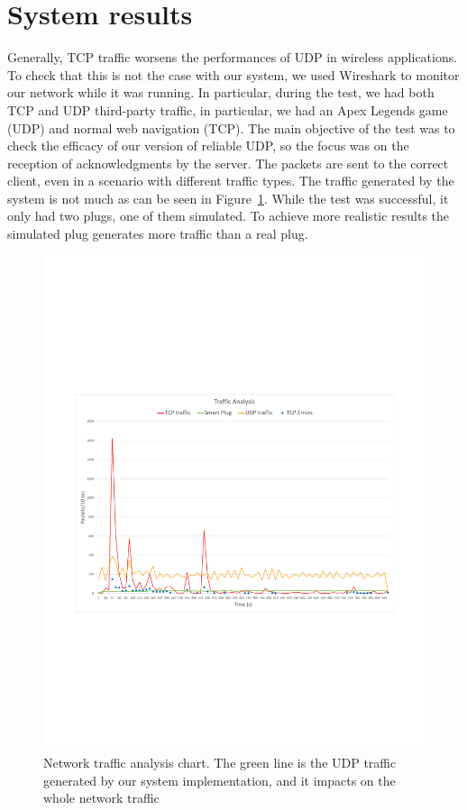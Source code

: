 \documentclass[conference]{IEEEtran}
\begin{document}
	\section{System results}
	Generally, TCP traffic worsens the performances of UDP in wireless applications. To check that this is not the case with our system,
	we used Wireshark to monitor our network while it was running. In particular, during the test, we had both TCP and UDP third-party traffic, in particular, we had an Apex Legends game (UDP) and normal web navigation (TCP). The main objective of the test was to check the efficacy of our version of reliable UDP, so the focus was on the reception of acknowledgments by the server. The packets are sent to the correct client, even in a scenario with different traffic types. The traffic generated by the system is not much as can be seen in Figure~\ref{fig:grafico}. While the test was successful, it only had two plugs, one of them simulated. To achieve more realistic results the simulated plug generates more traffic than a real plug. 

	\begin{figure}[htbp]
		\centering
		\includegraphics[width=\linewidth]{assets/grafico}
		\caption{Network traffic analysis chart. The green line is the UDP  traffic generated by our system implementation, and it impacts on the whole network traffic}
		\label{fig:grafico}
	\end{figure}
	
\end{document}
